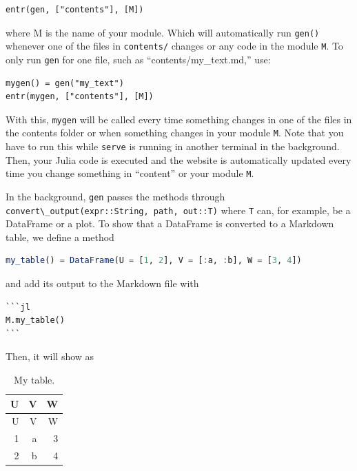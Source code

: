 \documentclass[
  notoc %
]{tufte-book}
\newcommand{\passthrough}[1]{#1}
\begin{document}
\begin{lstlisting}
entr(gen, ["contents"], [M])
\end{lstlisting}

where M is the name of your module. Which will automatically run
\passthrough{\lstinline!gen()!} whenever one of the files in
\passthrough{\lstinline!contents/!} changes or any code in the module
\passthrough{\lstinline!M!}. To only run \passthrough{\lstinline!gen!}
for one file, such as ``contents/my\_text.md,'' use:

\begin{lstlisting}
mygen() = gen("my_text")
entr(mygen, ["contents"], [M])
\end{lstlisting}

With this, \passthrough{\lstinline!mygen!} will be called every time
something changes in one of the files in the contents folder or when
something changes in your module \passthrough{\lstinline!M!}. Note that
you have to run this while \passthrough{\lstinline!serve!} is running in
another terminal in the background. Then, your Julia code is executed
and the website is automatically updated every time you change something
in ``content'' or your module \passthrough{\lstinline!M!}.

In the background, \passthrough{\lstinline!gen!} passes the methods
through
\passthrough{\lstinline!convert\_output(expr::String, path, out::T)!}
where \passthrough{\lstinline!T!} can, for example, be a DataFrame or a
plot. To show that a DataFrame is converted to a Markdown table, we
define a method

\begin{lstlisting}[language=Julia]
my_table() = DataFrame(U = [1, 2], V = [:a, :b], W = [3, 4])
\end{lstlisting}

and add its output to the Markdown file with

\begin{lstlisting}
```jl
M.my_table()
```
\end{lstlisting}

Then, it will show as

\hypertarget{tbl:my_table}{}
\begin{longtable}[]{@{}rrr@{}}
\caption{\label{tbl:my_table}My table.}\tabularnewline
\toprule
U & V & W \\
\midrule
\endfirsthead
\toprule
U & V & W \\
\midrule
\endhead
1 & a & 3 \\
2 & b & 4 \\
\bottomrule
\end{longtable}
\end{document}
